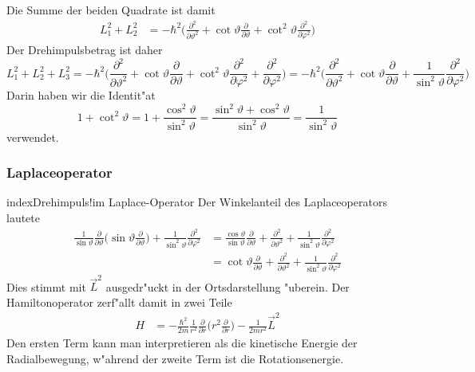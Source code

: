 Die Summe der beiden Quadrate ist damit
\begin{align*}
L_1^2+L_2^2
&=
-\hbar^2\biggl(
\frac{\partial^2}{\partial\vartheta^2}
+
\cot\vartheta\frac{\partial}{\partial\vartheta}
+
\cot^2\vartheta\frac{\partial^2}{\partial\varphi^2}
\biggr)
\end{align*}
Der Drehimpulsbetrag ist daher
\[
L_1^2+L_2^2+L_3^2
=
-\hbar^2\biggl(
\frac{\partial^2}{\partial\vartheta^2}
+
\cot\vartheta\frac{\partial}{\partial\vartheta}
+
\cot^2\vartheta\frac{\partial^2}{\partial\varphi^2}
+
\frac{\partial^2}{\partial\varphi^2}
\biggr)
=
-\hbar^2\biggl(
\frac{\partial^2}{\partial\vartheta^2}
+
\cot\vartheta\frac{\partial}{\partial\vartheta}
+
\frac1{\sin^2\vartheta}\frac{\partial^2}{\partial\varphi^2}
\biggr)
\]
Darin haben wir die Identit"at
\[
1+\cot^2\vartheta
=
1+\frac{\cos^2\vartheta}{\sin^2\vartheta}
=
\frac{\sin^2\vartheta+\cos^2\vartheta}{\sin^2\vartheta}
=
\frac{1}{\sin^2\vartheta}
\]
verwendet.

\subsubsection{Laplaceoperator}
index{Drehimpuls!im Laplace-Operator}
Der Winkelanteil des Laplaceoperators lautete
\begin{align*}
\frac1{\sin\vartheta}\frac{\partial}{\partial\vartheta}\biggl(
\sin\vartheta\frac{\partial}{\partial\vartheta}
\biggr)
+\frac1{\sin^2\vartheta}\frac{\partial^2}{\partial\varphi^2}
&=
\frac{\cos\vartheta}{\sin\vartheta}\frac{\partial}{\partial\vartheta}
+
\frac{\partial^2}{\partial\vartheta^2}
+
\frac{1}{\sin^2\vartheta}\frac{\partial^2}{\partial\varphi^2}
\\
&=
\cot\vartheta\frac{\partial}{\partial\vartheta}
+
\frac{\partial^2}{\partial\vartheta^2}
+
\frac{1}{\sin^2\vartheta}\frac{\partial^2}{\partial\varphi^2}
\end{align*}
Dies stimmt mit $\vec L^2$ ausgedr"uckt in der Ortsdarstellung "uberein.
Der Hamiltonoperator zerf"allt damit in zwei Teile
\begin{align*}
H
&=-\frac{\hbar^2}{2m}
\frac1{r^2}\frac{\partial}{\partial r}\biggl(r^2\frac{\partial}{\partial r}\biggr)
-\frac{1}{2mr^2}\vec L^2
\end{align*}
Den ersten Term kann man interpretieren als die kinetische Energie
der Radialbewegung, w"ahrend der zweite Term ist die Rotationsenergie.


